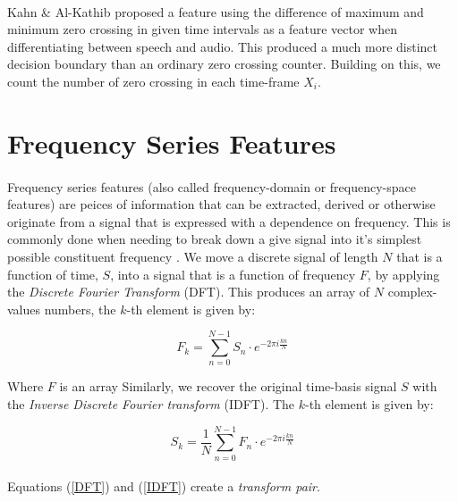 \documentclass[12pt,letterpaper]{article}
\begin{document}
\paragraph*{}Kahn \& Al-Kathib \cite{Kahn 2006} proposed a feature using the difference of maximum and minimum zero crossing in given time intervals as a feature vector when differentiating between speech and audio. This produced a much more distinct decision boundary than an ordinary zero crossing counter. Building on this, we count the number of zero crossing in each time-frame $X_i$.



\section{Frequency Series Features}

\paragraph*{}Frequency series features (also called frequency-domain or frequency-space features) are peices of information that can be extracted, derived or otherwise originate from a signal that is expressed with a dependence on frequency. This is commonly done when needing to break down a give signal into it's simplest possible constituent frequency \cite{Peatross 2015}. We move a discrete signal of length $N$ that is a function of time, $S$, into a signal that is a function of frequency $F$, by applying the \textit{Discrete Fourier Transform} (DFT). This produces an array of $N$ complex-values numbers, the $k$-th element is given by:

\begin{equation}
\label{DFT}
F_{k} =  \sum_{n=0}^{N-1} S_{n} \cdot e^{-2\pi i\frac{kn}{N}}
\end{equation}

Where $F$ is an array Similarly, we recover the original time-basis signal $S$ with the \textit{Inverse Discrete Fourier transform} (IDFT). The $k$-th element is given by:

\begin{equation}
\label{IDFT}
S_{k} =  \frac{1}{N}\sum_{n=0}^{N-1} F_{n} \cdot e^{-2\pi i\frac{kn}{N}}
\end{equation}

\paragraph*{}Equations (\ref{DFT}) and (\ref{IDFT}) create a \textit{transform pair}.
\end{document}
